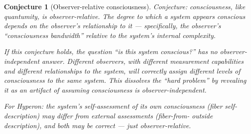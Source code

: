 \documentclass[11pt,a4paper]{article}
\newtheorem{conjecture}[definition]{Conjecture}
\begin{document}
\begin{conjecture}[Observer-relative consciousness]
Conjecture: consciousness, like quantumity, is observer-relative. The
degree to which a system appears conscious depends on the observer's
relationship to it --- specifically, the observer's ``consciousness
bandwidth'' relative to the system's internal complexity.

If this conjecture holds, the question ``is this system conscious?'' has
no observer-independent answer. Different observers, with different
measurement capabilities and different relationships to the system, will
correctly assign different levels of consciousness to the same system.
This dissolves the ``hard problem'' by revealing it as an artifact of
assuming consciousness is observer-independent.

For Hyperon: the system's self-assessment of its own consciousness
(fiber self-description) may differ from external assessments (fiber-from-
outside description), and both may be correct --- just observer-relative.
\end{conjecture}
\end{document}
